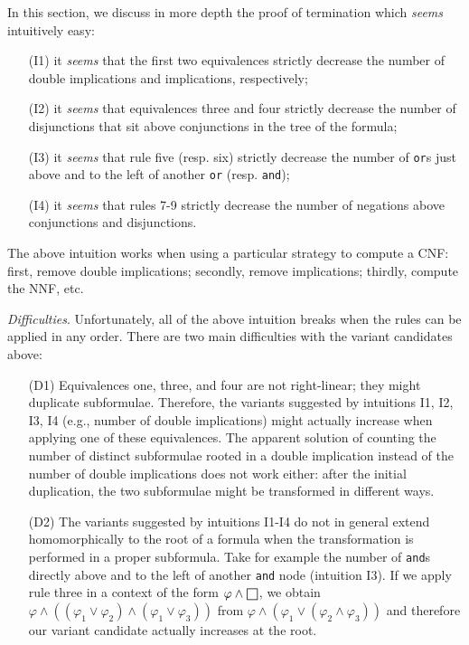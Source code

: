 In this section, we discuss in more depth the proof of termination 
which \emph{seems} intuitively easy:
%
\begin{enumerate}
%
\item[(I1)] it \emph{seems} that the first two equivalences strictly
  decrease the number of double implications and implications,
  respectively;
%
\item[(I2)] it \emph{seems} that equivalences three and four strictly
  decrease the number of disjunctions that sit above conjunctions in
  the tree of the formula;
%
\item[(I3)] it \emph{seems} that rule five (resp. six) strictly decrease
  the number of \texttt{or}s just above and to the left of another
  \texttt{or} (resp. \texttt{and});
%
\item[(I4)] it \emph{seems} that rules 7-9 strictly decrease the number
  of negations above conjunctions and disjunctions.
%
\end{enumerate}
%
The above intuition works when using a particular strategy to compute
a CNF: first, remove double implications; secondly, remove
implications; thirdly, compute the NNF, etc.

\emph{Difficulties}. Unfortunately, all of the above intuition breaks
when the rules can be applied in any order. There are two main
difficulties with the variant candidates above:
%
\begin{itemize}
%
\item[(D1)]\label{dif:d1} Equivalences one, three, and four are not
  right-linear; they might duplicate subformulae. Therefore, the
  variants suggested by intuitions I1, I2, I3, I4 (e.g., number of
  double implications) might actually increase when applying one of
  these equivalences. The apparent solution of counting the number of
  distinct subformulae rooted in a double implication instead of the
  number of double implications does not work either: after the
  initial duplication, the two subformulae might be transformed in
  different ways.
%
\item[(D2)] The variants suggested by intuitions I1-I4 do not in general
  extend homomorphically to the root of a formula when the
  transformation is performed in a proper subformula. Take for example
  the number of \texttt{and}s directly above and to the left of
  another \texttt{and} node (intuition I3). If we apply rule three in
  a context of the form \( \varphi \land \msquare \), we obtain
  \( \varphi \land ((\varphi_1 \lor \varphi_2) \land (\varphi_1 \lor
  \varphi_3)) \) from
  \( \varphi \land ( \varphi_1 \lor (\varphi_2 \land \varphi_3) ) \)
  and therefore our variant candidate actually increases at the root.
%
\end{itemize}

